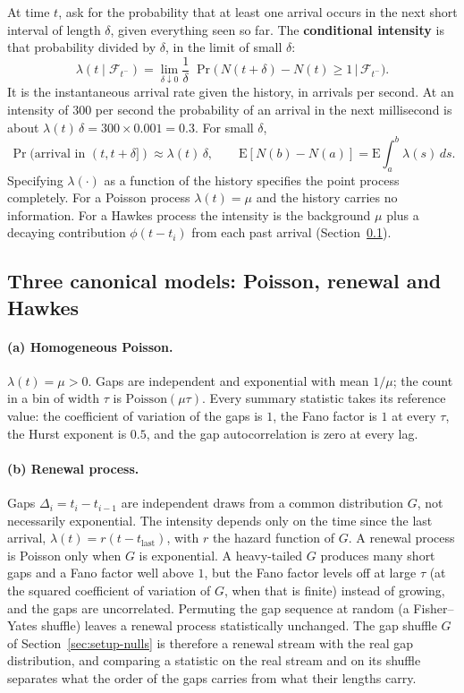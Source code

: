 At time $t$, ask for the probability that at least one arrival occurs in the next short
interval of length $\delta$, given everything seen so far. The \textbf{conditional
intensity} is that probability divided by $\delta$, in the limit of small $\delta$:
$$\lambda(t \mid \mathcal{F}_{t^-}) = \lim_{\delta \downarrow 0} \frac{1}{\delta}\;
\Pr\!\big(\, N(t + \delta) - N(t) \geq 1 \,\big|\, \mathcal{F}_{t^-} \big).$$
It is the instantaneous arrival rate given the history, in arrivals per second. At an
intensity of $300$ per second the probability of an arrival in the next millisecond is
about $\lambda(t)\,\delta = 300 \times 0.001 = 0.3$. For small $\delta$,
$$\Pr(\text{arrival in }(t, t+\delta]) \approx \lambda(t)\, \delta, \qquad
\mathrm{E}[N(b) - N(a)] = \mathrm{E}\!\int_a^b \lambda(s)\, ds.$$
Specifying $\lambda(\cdot)$ as a function of the history specifies the point process
completely. For a Poisson process $\lambda(t) = \mu$ and the history carries no
information. For a Hawkes process the intensity is the background $\mu$ plus a decaying
contribution $\phi(t - t_i)$ from each past arrival (Section~\ref{app:pp-canon}).

\subsection{Three canonical models: Poisson, renewal and Hawkes}
\label{app:pp-canon}

\paragraph{(a) Homogeneous Poisson.} $\lambda(t) = \mu > 0$. Gaps are independent and
exponential with mean $1/\mu$; the count in a bin of width $\tau$ is
$\mathrm{Poisson}(\mu \tau)$. Every summary statistic takes its reference value: the
coefficient of variation of the gaps is $1$, the Fano factor is $1$ at every $\tau$, the
Hurst exponent is $0.5$, and the gap autocorrelation is zero at every lag.

\paragraph{(b) Renewal process.} Gaps $\Delta_i = t_i - t_{i-1}$ are independent draws
from a common distribution $G$, not necessarily exponential. The intensity depends only on
the time since the last arrival, $\lambda(t) = r(t - t_{\mathrm{last}})$, with $r$ the
hazard function of $G$. A renewal process is Poisson only when $G$ is exponential. A
heavy-tailed $G$ produces many short gaps and a Fano factor well above $1$, but the Fano
factor levels off at large $\tau$ (at the squared coefficient of variation of $G$, when
that is finite) instead of growing, and the gaps are uncorrelated. Permuting the gap
sequence at random (a Fisher--Yates shuffle) leaves a renewal process statistically
unchanged. The gap shuffle $G$ of Section~\ref{sec:setup-nulls} is therefore a renewal
stream with the real gap distribution, and comparing a statistic on the real stream and on
its shuffle separates what the order of the gaps carries from what their lengths carry.


